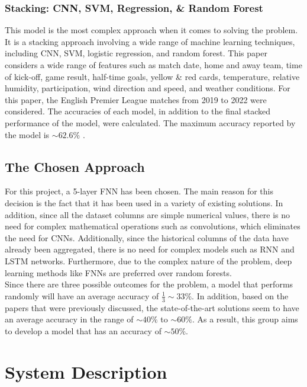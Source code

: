 \documentclass[rgb,listoffigures,listoftables,final]{cam-thesis}
\begin{document}
    \subsection{Stacking: CNN, SVM, Regression, \& Random Forest}
    This model is the most complex approach when it comes to solving the problem. It is a stacking approach involving a wide range of machine learning techniques, including CNN, SVM, logistic regression, and random forest. This paper considers a wide range of features such as match date, home and away team, time of kick-off, game result, half-time goals, yellow \& red cards, temperature, relative humidity, participation, wind direction and speed, and weather conditions. For this paper, the English Premier League matches from 2019 to 2022 were considered. The accuracies of each model, in addition to the final stacked performance of the model, were calculated. The maximum accuracy reported by the model is $\sim 62.6\%$  \cite{stackingmodelexample}.
    
    \section{The Chosen Approach}
    For this project, a 5-layer FNN has been chosen. The main reason for this decision is the fact that it has been used in a variety of existing solutions. In addition, since all the dataset columns are simple numerical values, there is no need for complex mathematical operations such as convolutions, which eliminates the need for CNNs. Additionally, since the historical columns of the data have already been aggregated, there is no need for complex models such as RNN and LSTM networks. Furthermore, due to the complex nature of the problem, deep learning methods like FNNs are preferred over random forests.\\

    Since there are three possible outcomes for the problem, a model that performs randomly will have an average accuracy of $\frac{1}{3} \sim 33\%$. In addition, based on the papers that were previously discussed, the state-of-the-art solutions seem to have an average accuracy in the range of $\sim 40\%$ to $\sim 60\%$. As a result, this group aims to develop a model that has an accuracy of $\sim 50\%$.
    

\chapter{System Description}
\end{document}
